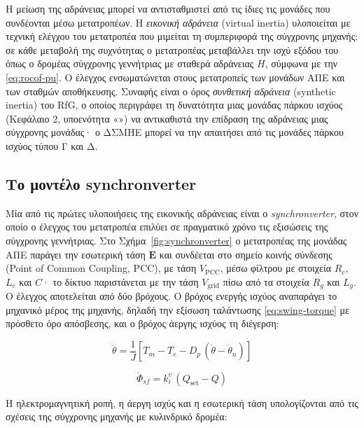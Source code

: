 Η μείωση της αδράνειας μπορεί να αντισταθμιστεί από τις ίδιες τις μονάδες που συνδέονται μέσω
μετατροπέων. Η \emph{εικονική αδράνεια} (virtual inertia) υλοποιείται με τεχνική ελέγχου του
μετατροπέα που μιμείται τη συμπεριφορά της σύγχρονης μηχανής: σε κάθε μεταβολή της συχνότητας ο
μετατροπέας μεταβάλλει την ισχύ εξόδου του όπως ο δρομέας σύγχρονης γεννήτριας με σταθερά
αδράνειας $H$, σύμφωνα με την \eqref{eq:rocof-pu}. Ο έλεγχος ενσωματώνεται στους μετατροπείς των
μονάδων ΑΠΕ και των σταθμών αποθήκευσης. Συναφής είναι ο όρος \emph{συνθετική αδράνεια}
(synthetic inertia) του RfG, ο οποίος περιγράφει τη δυνατότητα μιας μονάδας πάρκου ισχύος
(Κεφάλαιο 2, υποενότητα «») να αντικαθιστά την επίδραση της αδράνειας μιας
σύγχρονης μονάδας· ο ΔΣΜΗΕ μπορεί να την απαιτήσει από τις μονάδες πάρκου ισχύος τύπου Γ και Δ.

\subsection{Το μοντέλο synchronverter}
\label{sec:synchronverter}

Μία από τις πρώτες υλοποιήσεις της εικονικής αδράνειας είναι ο \emph{synchronverter}, στον
οποίο ο έλεγχος του μετατροπέα επιλύει σε πραγματικό χρόνο τις εξισώσεις της σύγχρονης
γεννήτριας. Στο Σχήμα~\ref{fig:synchronverter} ο μετατροπέας της μονάδας ΑΠΕ παράγει την
εσωτερική τάση $\mathbf{E}$ και συνδέεται στο σημείο κοινής σύνδεσης (Point of Common Coupling,
PCC), με τάση $V_{\mathrm{PCC}}$, μέσω φίλτρου με στοιχεία $R_c$, $L_c$ και $C$· το δίκτυο
παριστάνεται με την τάση $V_{\mathrm{grid}}$ πίσω από τα στοιχεία $R_g$ και $L_g$. Ο έλεγχος
αποτελείται από δύο βρόχους. Ο βρόχος ενεργής ισχύος αναπαράγει το μηχανικό μέρος της
μηχανής, δηλαδή την εξίσωση ταλάντωσης \eqref{eq:swing-torque} με πρόσθετο όρο απόσβεσης, και
ο βρόχος άεργης ισχύος τη διέγερση:

\begin{equation}
\ddot{\theta} = \frac{1}{J}\left[T_m - T_e - D_p\,(\dot{\theta} - \dot{\theta}_n)\right]
\label{eq:sv-swing}
\end{equation}

\begin{equation}
\dot{\Phi}_{sf} = k_i^v\,(Q_{\mathrm{set}} - Q)
\label{eq:sv-flux}
\end{equation}

Η ηλεκτρομαγνητική ροπή, η άεργη ισχύς και η εσωτερική τάση υπολογίζονται από τις σχέσεις της
σύγχρονης μηχανής με κυλινδρικό δρομέα:

